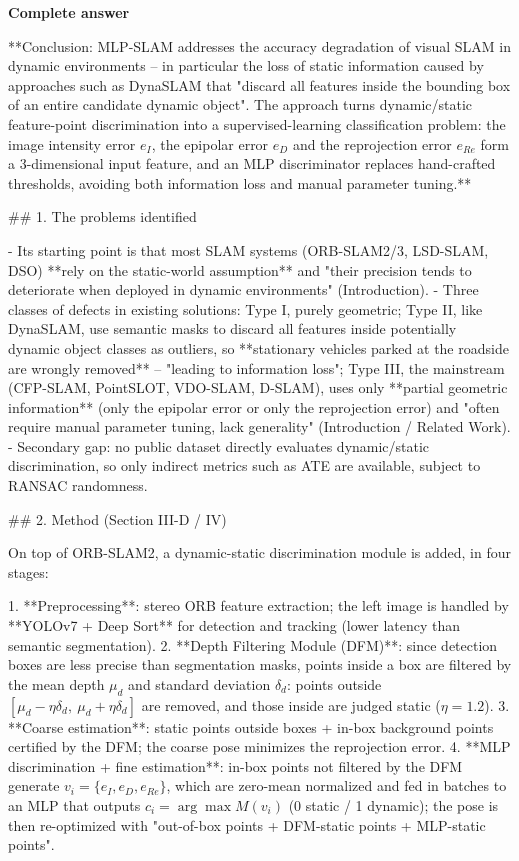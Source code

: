\documentclass[10pt]{article}
\begin{document}
\textbf{Complete answer}
\begin{AnswerText}
**Conclusion: MLP-SLAM addresses the accuracy degradation of visual SLAM in dynamic environments -- in particular the loss of static information caused by approaches such as DynaSLAM that "discard all features inside the bounding box of an entire candidate dynamic object". The approach turns dynamic/static feature-point discrimination into a supervised-learning classification problem: the image intensity error $e_I$, the epipolar error $e_D$ and the reprojection error $e_{Re}$ form a 3-dimensional input feature, and an MLP discriminator replaces hand-crafted thresholds, avoiding both information loss and manual parameter tuning.**

## 1. The problems identified

- Its starting point is that most SLAM systems (ORB-SLAM2/3, LSD-SLAM, DSO) **rely on the static-world assumption** and "their precision tends to deteriorate when deployed in dynamic environments" (Introduction).
- Three classes of defects in existing solutions: Type I, purely geometric; Type II, like DynaSLAM, use semantic masks to discard all features inside potentially dynamic object classes as outliers, so **stationary vehicles parked at the roadside are wrongly removed** -- "leading to information loss"; Type III, the mainstream (CFP-SLAM, PointSLOT, VDO-SLAM, D-SLAM), uses only **partial geometric information** (only the epipolar error or only the reprojection error) and "often require manual parameter tuning, lack generality" (Introduction / Related Work).
- Secondary gap: no public dataset directly evaluates dynamic/static discrimination, so only indirect metrics such as ATE are available, subject to RANSAC randomness.

## 2. Method (Section III-D / IV)

On top of ORB-SLAM2, a dynamic-static discrimination module is added, in four stages:

1. **Preprocessing**: stereo ORB feature extraction; the left image is handled by **YOLOv7 + Deep Sort** for detection and tracking (lower latency than semantic segmentation).
2. **Depth Filtering Module (DFM)**: since detection boxes are less precise than segmentation masks, points inside a box are filtered by the mean depth $\mu_d$ and standard deviation $\delta_d$: points outside $[\mu_d-\eta\delta_d,\ \mu_d+\eta\delta_d]$ are removed, and those inside are judged static ($\eta=1.2$).
3. **Coarse estimation**: static points outside boxes + in-box background points certified by the DFM; the coarse pose minimizes the reprojection error.
4. **MLP discrimination + fine estimation**: in-box points not filtered by the DFM generate $v_i=\{e_I,e_D,e_{Re}\}$, which are zero-mean normalized and fed in batches to an MLP that outputs $c_i=\arg\max M(v_i)$ (0 static / 1 dynamic); the pose is then re-optimized with "out-of-box points + DFM-static points + MLP-static points".


\end{AnswerText}
\end{document}
